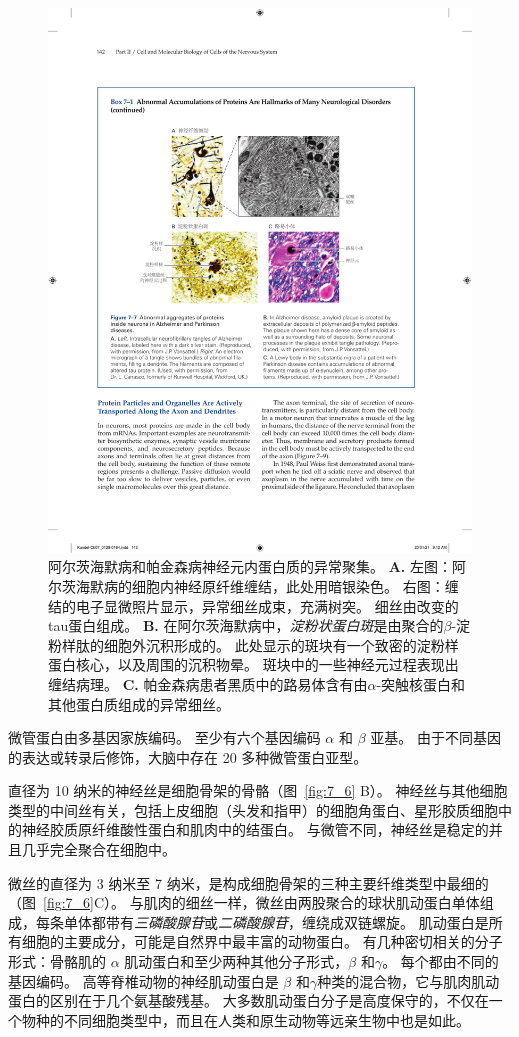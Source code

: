 \begin{figure}[htbp]
	\centering
	\includegraphics[width=0.8\linewidth]{chap07/fig_7_7}
	\caption{阿尔茨海默病和帕金森病神经元内蛋白质的异常聚集。
	\textbf{A.} 左图：阿尔茨海默病的细胞内神经原纤维缠结，此处用暗银染色。
	右图：缠结的电子显微照片显示，异常细丝成束，充满树突。
	细丝由改变的tau蛋白组成。
	\textbf{B.} 在阿尔茨海默病中，\textit{淀粉状蛋白斑}是由聚合的$\beta$-淀粉样肽的细胞外沉积形成的。
	此处显示的斑块有一个致密的淀粉样蛋白核心，以及周围的沉积物晕。
	斑块中的一些神经元过程表现出缠结病理。
	\textbf{C.} 帕金森病患者黑质中的路易体含有由$\alpha$-突触核蛋白和其他蛋白质组成的异常细丝。}
	\label{fig:7_7}
\end{figure}


微管蛋白由多基因家族编码。
至少有六个基因编码 $\alpha$ 和 $\beta$ 亚基。
由于不同基因的表达或转录后修饰，大脑中存在 20 多种微管蛋白亚型。


直径为 10 纳米的神经丝是细胞骨架的骨骼（图~\ref{fig:7_6} B）。
神经丝与其他细胞类型的中间丝有关，包括上皮细胞（头发和指甲）的细胞角蛋白、星形胶质细胞中的神经胶质原纤维酸性蛋白和肌肉中的结蛋白。
与微管不同，神经丝是稳定的并且几乎完全聚合在细胞中。


微丝的直径为 3 纳米至 7 纳米，是构成细胞骨架的三种主要纤维类型中最细的（图~\ref{fig:7_6}C）。
与肌肉的细丝一样，微丝由两股聚合的球状肌动蛋白单体组成，每条单体都带有\textit{三磷酸腺苷}或\textit{二磷酸腺苷}，缠绕成双链螺旋。
肌动蛋白是所有细胞的主要成分，可能是自然界中最丰富的动物蛋白。
有几种密切相关的分子形式：骨骼肌的 $\alpha$ 肌动蛋白和至少两种其他分子形式，$\beta$ 和$\gamma$。
每个都由不同的基因编码。
高等脊椎动物的神经肌动蛋白是 $\beta$ 和$\gamma$种类的混合物，它与肌肉肌动蛋白的区别在于几个氨基酸残基。 
大多数肌动蛋白分子是高度保守的，不仅在一个物种的不同细胞类型中，而且在人类和原生动物等远亲生物中也是如此。


